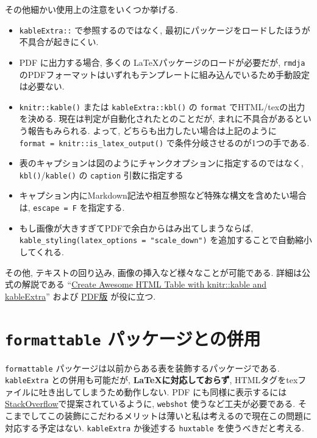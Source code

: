 \documentclass[
]{bxjsbook}
\providecommand{\tightlist}{%
  \setlength{\itemsep}{0pt}\setlength{\parskip}{0pt}}
\theoremstyle{definition}
\theoremstyle{definition}
\theoremstyle{definition}
\theoremstyle{remark}
\begin{document}
その他細かい使用上の注意をいくつか挙げる.

\begin{itemize}
\tightlist
\item
  \texttt{kableExtra::} で参照するのではなく,
  最初にパッケージをロードしたほうが不具合が起きにくい.
\item
  PDF に出力する場合, 多くの \LaTeX パッケージのロードが必要だが,
  \texttt{rmdja}
  のPDFフォーマットはいずれもテンプレートに組み込んでいるため手動設定は必要ない.
\item
  \texttt{knitr::kable()} または \texttt{kableExtra::kbl()} の
  \texttt{format} でHTML/texの出力を決める.
  現在は判定が自動化されたとのことだが,
  まれに不具合があるという報告もみられる. よって,
  どちらも出力したい場合は上記のように
  \texttt{format\ =\ knitr::is\_latex\_output()}
  で条件分岐させるのが1つの手である.
\item
  表のキャプションは図のようにチャンクオプションに指定するのではなく,
  \texttt{kbl()}/\texttt{kable()} の \texttt{caption} 引数に指定する
\item
  キャプション内にMarkdown記法や相互参照など特殊な構文を含めたい場合は,
  \texttt{escape\ =\ F} を指定する.
\item
  もし画像が大きすぎてPDFで余白からはみ出てしまうならば,
  \texttt{kable\_styling(latex\_options\ =\ "scale\_down")}
  を追加することで自動縮小してくれる.
\end{itemize}

その他, テキストの回り込み, 画像の挿入など様々なことが可能である.
詳細は公式の解説である
``\href{https://cran.r-project.org/web/packages/kableExtra/vignettes/awesome_table_in_html.html}{Create
Awesome HTML Table with knitr::kable and kableExtra}'' および
\href{http://haozhu233.github.io/kableExtra/awesome_table_in_pdf.pdf}{PDF版}
が役に立つ.

\hypertarget{formattable-ux30d1ux30c3ux30b1ux30fcux30b8ux3068ux306eux4f75ux7528}{%
\section{\texorpdfstring{\texttt{formattable}
パッケージとの併用}{formattable パッケージとの併用}}\label{formattable-ux30d1ux30c3ux30b1ux30fcux30b8ux3068ux306eux4f75ux7528}}

\texttt{formattable}
パッケージは以前からある表を装飾するパッケージである.
\texttt{kableExtra} との併用も可能だが,
\textbf{\LaTeX  に対応しておらず},
HTMLタグをtexファイルに吐き出してしまうため動作しない. PDF
にも同様に表示するには
\href{https://stackoverflow.com/questions/34983822/how-to-have-r-formattable-rendered-to-pdf-output-and-how-to-have-percents-in-the}{StackOverflow}で提案されているように,
\texttt{webshot} 使うなど工夫が必要である.
そこまでしてこの装飾にこだわるメリットは薄いと私は考えるので現在この問題に対応する予定はない.
\texttt{kableExtra} か後述する \texttt{huxtable} を使うべきだと考える.
\end{document}
